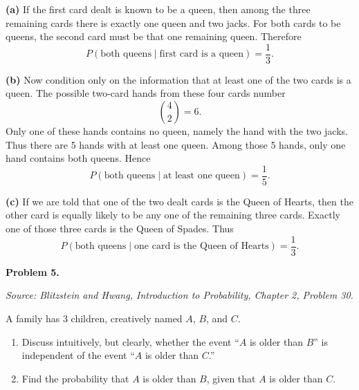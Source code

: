 \documentclass[11pt]{article}
\newcommand{\source}[1]{%
    \vspace{0.15cm}
    {\small\textit{Source: Blitzstein and Hwang, \textit{Introduction to Probability}, Chapter 2, Problem #1.}}
}
\begin{document}
\begin{solutionbox}
\textbf{(a)} If the first card dealt is known to be a queen, then among the three remaining cards there is exactly one queen and two jacks. For both cards to be queens, the second card must be that one remaining queen. Therefore
\[
P(\text{both queens}\mid \text{first card is a queen})=\frac13.
\]



\textbf{(b)} Now condition only on the information that at least one of the two cards is a queen. The possible two-card hands from these four cards number
\[
\binom{4}{2}=6.
\]
Only one of these hands contains no queen, namely the hand with the two jacks. Thus there are 5 hands with at least one queen. Among those 5 hands, only one hand contains both queens. Hence
\[
P(\text{both queens}\mid \text{at least one queen})=\frac15.
\]



\textbf{(c)} If we are told that one of the two dealt cards is the Queen of Hearts, then the other card is equally likely to be any one of the remaining three cards. Exactly one of those three cards is the Queen of Spades. Thus
\[
P(\text{both queens}\mid \text{one card is the Queen of Hearts})=\frac13.
\]

\end{solutionbox}
\newpage


\begin{problemheader}
\textbf{Problem 5. }
\end{problemheader}
\source{30}

A family has 3 children, creatively named $A$, $B$, and $C$.

\begin{enumerate}[label=(\alph*), leftmargin=*]
    \item Discuss intuitively, but clearly, whether the event ``$A$ is older than $B$'' is independent of the event ``$A$ is older than $C$.''

    \item Find the probability that $A$ is older than $B$, given that $A$ is older than $C$.
\end{enumerate}
\end{document}

